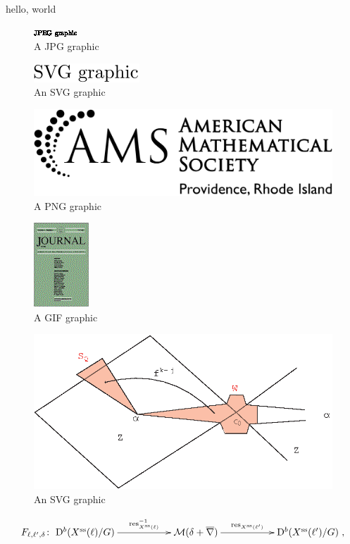 \documentclass{amsart}
\begin{document}
hello, world

\begin{figure}[h]
\includegraphics{sample-jpeg}
\caption{A JPG graphic}
\end{figure}

\begin{figure}[h]
\includegraphics{sample-svg}
\caption{An SVG graphic}
\end{figure}

\begin{figure}[h]
\includegraphics{ams-logo}
\caption{A PNG graphic}
\end{figure}

\begin{figure}[h]
\includegraphics{jams-cover}
\caption{A GIF graphic}
\end{figure}

\begin{figure}[h]
\includegraphics{graphics-include}
\caption{An SVG graphic}
\end{figure}

\[
F_{\ell, \ell', \delta} \colon \xymatrix{ \mathrm{D}^b(X^{\mathrm{ss}}(\ell) / G) \ar[rr]^-{\operatorname{res}_{X^{\mathrm{ss}}(\ell)}^{-1}} & & \mathcal{M}(\delta + \overline{\nabla}) \ar[rr]^-{\operatorname{res}_{X^{\mathrm{ss}}(\ell')}} & & \mathrm{D}^b(X^{\mathrm{ss}}(\ell')/G)},
\]
\end{document}
